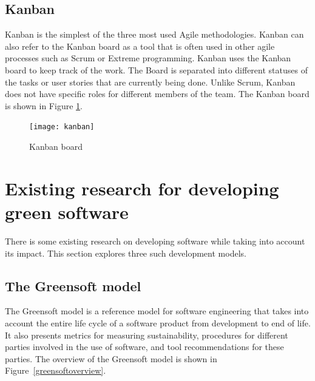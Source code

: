 \subsection{Kanban}\label{kanbanmethod}
Kanban is the simplest of the three most used Agile methodologies. Kanban can also refer to the Kanban board as a tool that is often used in other agile processes such as Scrum or Extreme programming. Kanban uses the Kanban board to keep track of the work. The Board is separated into different statuses of the tasks or user stories that are currently being done. Unlike Scrum, Kanban does not have specific roles for different members of the team. The Kanban board is shown in Figure \ref{kanban}.

\begin{figure}[H]
\caption{Kanban board}
\label{kanban}
\texttt{[image: kanban]}
\centering
\end{figure}

\section{Existing research for developing green software}
There is some existing research on developing software while taking into account its impact. This section explores three such development models.

\subsection{The Greensoft model}\label{greensoft}
The Greensoft model is a reference model for software engineering that takes into account the entire life cycle of a software product from development to end of life. It also presents metrics for measuring sustainability, procedures for different parties involved in the use of software, and tool recommendations for these parties. The overview of the Greensoft model is shown in Figure~\ref{greensoftoverview}.

